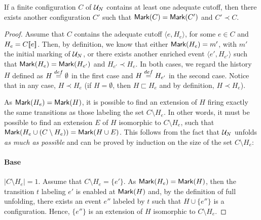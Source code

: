 \setcounter{theorem}{19}
\begin{lemma}
\label{lem:if.a}
If a finite configuration $C$ of $\mathcal{U}_{N}$ contains at least one adequate
cutoff, then there exists another configuration $C'$ such that $\mathsf{Mark }{(C)} =
\mathsf{Mark }{(C')}$ and $C' \prec C$.
\end{lemma}

\begin{proof}

Assume that $C$ contains the adequate cutoff $\langle e, H_e \rangle$, for some
$e \in C$ and $H_e = C [\![ e]\!]$.  Then, by definition, we know that either
$\mathsf{Mark }{(H_e)} = m'$, with $m'$ the initial marking of $\mathcal{U}_{N}$, or there
exists another enriched event $\langle e', H_{e'} \rangle$ such that
$\mathsf{Mark }{(H_e)} = \mathsf{Mark }{(H_{e'})}$ and $H_{e'} \prec H_e$.  In both cases, we
regard the history $H$ defined as $H \stackrel{def}{=} \emptyset$ in the first case and
$H \stackrel{def}{=} H_{e'}$ in the second case.  Notice that in any case, $H \prec
H_e$ (if $H = \emptyset$, then $H \sqsubset H_e$ and by definition, $H \prec
H_e$).

As $\mathsf{Mark }{(H_e)} = \mathsf{Mark }{(H)}$, it is possible to find an extension of $H$
firing exactly the same transitions as those labeling the set $C \setminus
H_e$.  In other words, it must be possible to find an extension $E$ of $H$
isomorphic to $C \setminus H_e$, such that $\mathsf{Mark }{(H_e \cup (C \setminus
H_e))} = \mathsf{Mark }{(H \cup E)}$.  This follows from the fact that $\mathcal{U}_{N}$ unfolds
\emph{as much as possible} and can be proved by induction on the size of the
set $C \setminus H_e$:

\paragraph{Base}  $|C \setminus H_e| = 1$.  Assume that $C \setminus H_e =
\{e'\}$.  As $\mathsf{Mark }{(H_e)} = \mathsf{Mark }{(H)}$, then the transition $t$ labeling
$e'$ is enabled at $\mathsf{Mark }{(H)}$ and, by the definition of full unfolding,
there exists an event $e''$ labeled by $t$ such that $H \cup \{e''\}$ is a
configuration.  Hence, $\{e''\}$ is an extension of $H$ isomorphic to $C
\setminus H_e$.


\end{proof}
